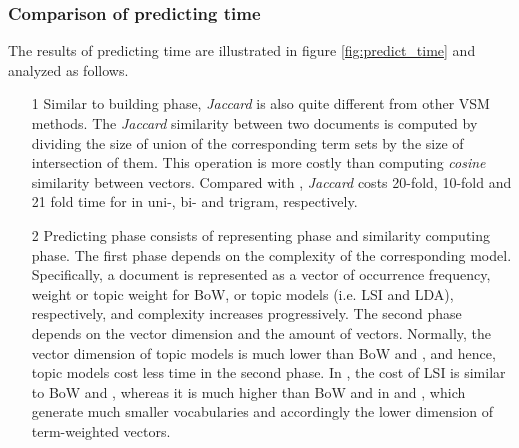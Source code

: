 \subsubsection{Comparison of predicting time}

The results of predicting time are illustrated in figure \ref{fig:predict_time} and analyzed as follows. 


\begin{itemize}
\item[1] Similar to building phase, \textit{Jaccard} is also quite different from other VSM methods. The \textit{Jaccard} similarity between two documents is computed by dividing the size of union of the corresponding term sets by the size of intersection of them. This operation is more costly than computing \textit{cosine} similarity between vectors. Compared with \tfidf{}, \textit{Jaccard} costs 20-fold, 10-fold and 21 fold time for \icontent{} in uni-, bi- and trigram, respectively.

\item[2] Predicting phase consists of representing phase and similarity computing phase. The first phase depends on the complexity of the corresponding model. Specifically, a document is represented as a vector of occurrence frequency, \tfidf{} weight or topic weight for BoW, \tfidf{} or topic models (i.e. LSI and LDA), respectively, and complexity increases progressively. The second phase depends on the vector dimension and the amount of vectors. Normally, the vector dimension of topic models is much lower than BoW and \tfidf{}, and hence, topic models cost less time in the second phase. In \icontent{}, the cost of LSI is similar to BoW and \tfidf{}, whereas it is much higher than BoW and \tfidf{} in \ititle{} and \isummary{}, which generate much smaller vocabularies and accordingly the lower dimension of term-weighted vectors. 

\end{itemize} 

